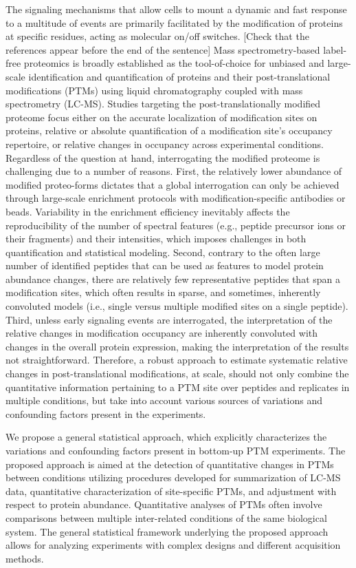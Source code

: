 \documentclass[mcp]{article}
\numberwithin{figure}{section} %
\numberwithin{table}{section}
\def\todo#1{{\color{red}[#1]}}
\begin{document}
The signaling mechanisms that allow cells to mount a dynamic and fast response to a multitude of events are primarily facilitated by the modification of proteins at specific residues, acting as molecular on/off switches.\cite{Deribe} \cite{Cohen} \todo{Check that the references appear before the end of the sentence} Mass spectrometry-based label-free proteomics is broadly established as the tool-of-choice for unbiased and large-scale identification and quantification of proteins and their post-translational modifications (PTMs) using liquid chromatography coupled with mass spectrometry (LC-MS).\cite{Kall:2011ub} \cite{Roepstorff} Studies targeting the post-translationally modified proteome focus either on the accurate localization of modification sites on proteins, relative or absolute quantification of a modification site's occupancy repertoire, or relative changes in occupancy across experimental conditions.\cite{Mann} Regardless of the question at hand, interrogating the modified proteome is challenging due to a number of reasons. First, the relatively lower abundance of modified proteo-forms dictates that a global interrogation can only be achieved through large-scale enrichment protocols with modification-specific antibodies or beads. Variability in the enrichment efficiency inevitably affects the reproducibility of the number of spectral features (e.g., peptide precursor ions or their fragments) and their intensities, which imposes challenges in both quantification and statistical modeling. Second, contrary to the often large number of identified peptides that can be used as features to model protein abundance changes, there are relatively few representative peptides that span a modification sites, which often results in sparse, and sometimes, inherently convoluted models (i.e., single versus multiple modified sites on a single peptide). Third, unless early signaling events are interrogated, the interpretation of the relative changes in modification occupancy are inherently convoluted with changes in the overall protein expression, making the interpretation of the results not straightforward.\cite{Olsen:2013} Therefore, a robust approach to estimate systematic relative changes in post-translational modifications, at scale, should not only combine the quantitative information pertaining to a PTM site over peptides and replicates in multiple conditions, but take into account various sources of variations and confounding factors present in the experiments.
 
We propose a general statistical approach, which explicitly characterizes the variations and confounding factors present in bottom-up PTM experiments. The proposed approach is aimed at the detection of quantitative changes in PTMs between conditions utilizing procedures developed for summarization of LC-MS data, quantitative characterization of site-specific PTMs, and adjustment with respect to protein abundance. Quantitative analyses of PTMs often involve comparisons between multiple inter-related conditions of the same biological system. The general statistical framework underlying the proposed approach allows for analyzing experiments with complex designs and different acquisition methods. 
\end{document}
